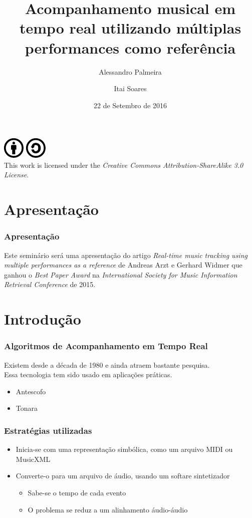 \documentclass[serif,mathserif]{beamer}
\author[Alessandro Palmeira\\ \and Itai Soares]{Alessandro Palmeira\\ \and Itai Soares}
\title[Instituto de Matemática e Estatística - USP\hspace{2em}\insertframenumber/\inserttotalframenumber]{Acompanhamento musical em tempo real utilizando múltiplas performances como referência}
\date{22 de Setembro de 2016} %
\institute{MAC6917 Topics in Sound and Music Computing: Music Information Retrieval}
\newcommand{\CcImageBy}[1]{%
  \includegraphics[scale=#1]{src/img/creative_commons/cc_by_30.pdf}%
}
\newcommand{\CcImageSa}[1]{%
  \includegraphics[scale=#1]{src/img/creative_commons/cc_sa_30.pdf}%
}
\newcommand{\CcGroupBySa}[2]{%
  \CcImageBy{#1}\hspace*{#2}\CcImageSa{#1}%
}
\newcommand{\CcLongnameBySa}{Attribution-ShareAlike}
\newcommand{\CcNote}[1]{%
  This work is licensed under the \textit{Creative Commons #1 3.0 License}.%
}
\begin{document}
\begin{frame}
  \titlepage
  \begin{center}
    \CcGroupBySa{0.83}{0.95ex}\\
    {\tiny\CcNote{\CcLongnameBySa}}
  \end{center}
\end{frame}

\section{Apresentação}
\begin{frame}
  \frametitle{Apresentação}
  Este seminário será uma apresentação do artigo \emph{Real-time music tracking using multiple performances as a reference} de Andreas Arzt e Gerhard Widmer que ganhou o \emph{Best Paper Award} na  \emph{International Society for Music Information Retrieval Conference} de 2015.
\end{frame}

\section{Introdução}  %

\begin{frame}
  \frametitle{Algoritmos de Acompanhamento em Tempo Real}
  Existem desde a década de 1980 e ainda atraem bastante pesquisa.\pause\\
  Essa tecnologia tem sido usado em aplicações práticas.\pause
  \begin{itemize}
    \item Antescofo\\\pause
    \item Tonara
  \end{itemize}
\end{frame}

\begin{frame}
  \frametitle{Estratégias utilizadas}
  \begin{itemize}
    \item Inicia-se com uma representação simbólica, como um arquivo MIDI ou MusicXML\\\pause
    \item Converte-o para um arquivo de áudio, usando um softare sintetizador\pause
      \begin{itemize}
        \item Sabe-se o tempo de cada evento\\\pause
        \item O problema se reduz a um alinhamento áudio-áudio
      \end{itemize}
  \end{itemize}
\end{frame}
\end{document}
